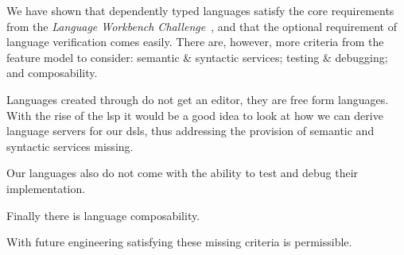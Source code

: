We have shown that dependently typed languages satisfy the core requirements from the \emph{Language Workbench Challenge}~\cite{DBLP:conf/sle/ErdwegSVBBCGHKLKMPPSSSVVVWW13}, and that the optional requirement of language verification comes easily.
%
There are, however, more criteria from the feature model to consider:
semantic \& syntactic services;
testing \& debugging;
and
composability.
%


Languages created through \Idris{} do not get an editor, they are free form languages.
%
With the rise of the \acf*{lsp} it would be a good idea to look at how we can derive language servers for our \acp{dsl}, thus addressing the provision of semantic and syntactic services missing.


Our languages also do not come with the ability to test and debug their implementation.


Finally there is language composability.


With future engineering satisfying these missing criteria is permissible.



